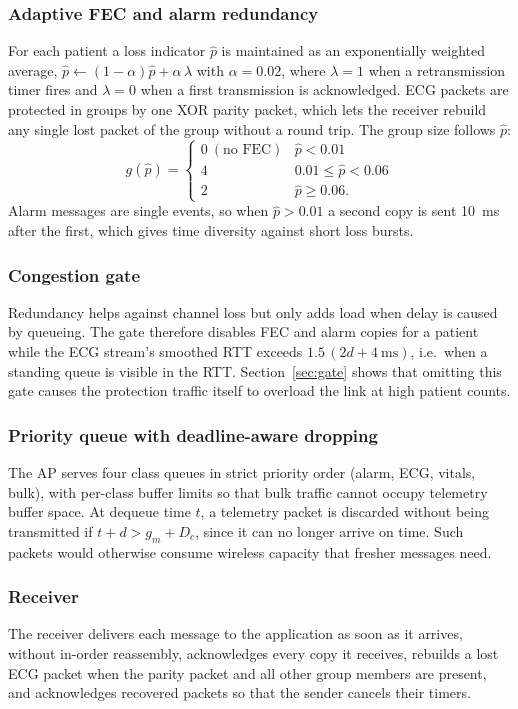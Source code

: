 \documentclass[10pt,twocolumn,letterpaper]{article}
\begin{document}
\subsubsection{Adaptive FEC and alarm redundancy}
For each patient a loss indicator $\hat p$ is maintained as an exponentially weighted average, $\hat p\leftarrow(1-\alpha)\hat p+\alpha\,\lambda$ with $\alpha=0.02$, where $\lambda=1$ when a retransmission timer fires and $\lambda=0$ when a first transmission is acknowledged. ECG packets are protected in groups by one XOR parity packet, which lets the receiver rebuild any single lost packet of the group without a round trip. The group size follows $\hat p$:
\begin{equation}
g(\hat p)=\begin{cases}0\ (\text{no FEC}) & \hat p<0.01\\ 4 & 0.01\le\hat p<0.06\\ 2 & \hat p\ge 0.06.\end{cases}
\end{equation}
Alarm messages are single events, so when $\hat p>0.01$ a second copy is sent 10~ms after the first, which gives time diversity against short loss bursts.

\subsubsection{Congestion gate}
Redundancy helps against channel loss but only adds load when delay is caused by queueing. The gate therefore disables FEC and alarm copies for a patient while the ECG stream's smoothed RTT exceeds $1.5\,(2d+4\ \mathrm{ms})$, i.e.\ when a standing queue is visible in the RTT. Section~\ref{sec:gate} shows that omitting this gate causes the protection traffic itself to overload the link at high patient counts.

\subsubsection{Priority queue with deadline-aware dropping}
The AP serves four class queues in strict priority order (alarm, ECG, vitals, bulk), with per-class buffer limits so that bulk traffic cannot occupy telemetry buffer space. At dequeue time $t$, a telemetry packet is discarded without being transmitted if $t+d>g_m+D_c$, since it can no longer arrive on time. Such packets would otherwise consume wireless capacity that fresher messages need.

\subsubsection{Receiver}
The receiver delivers each message to the application as soon as it arrives, without in-order reassembly, acknowledges every copy it receives, rebuilds a lost ECG packet when the parity packet and all other group members are present, and acknowledges recovered packets so that the sender cancels their timers.
\end{document}
